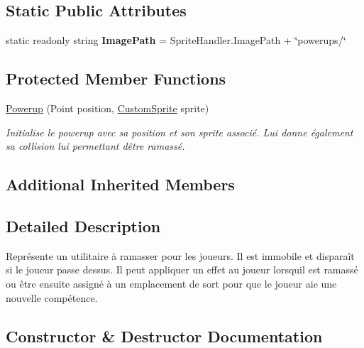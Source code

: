 \subsection*{Static Public Attributes}
\begin{DoxyCompactItemize}
\item 
\mbox{\label{class_tentacle_slicers_1_1powerups_1_1_powerup_acf939e19b2fb3f9ec0a8c47daa795a8c}} 
static readonly string {\bfseries Image\+Path} = Sprite\+Handler.\+Image\+Path + \char`\"{}powerups/\char`\"{}
\end{DoxyCompactItemize}
\subsection*{Protected Member Functions}
\begin{DoxyCompactItemize}
\item 
\hyperlink{class_tentacle_slicers_1_1powerups_1_1_powerup_a4b83aa8ef331b7af95c7a33b8e442f31}{Powerup} (Point position, \hyperlink{class_tentacle_slicers_1_1graphics_1_1_custom_sprite}{Custom\+Sprite} sprite)
\begin{DoxyCompactList}\small\item\em Initialise le powerup avec sa position et son sprite associé. Lui donne également sa collision lui permettant d\textquotesingle{}être ramassé. \end{DoxyCompactList}\end{DoxyCompactItemize}
\subsection*{Additional Inherited Members}


\subsection{Detailed Description}
Représente un utilitaire à ramasser pour les joueurs. Il est immobile et disparaît si le joueur passe dessus. Il peut appliquer un effet au joueur lorsqu\textquotesingle{}il est ramassé ou être ensuite assigné à un emplacement de sort pour que le joueur aie une nouvelle compétence. 



\subsection{Constructor \& Destructor Documentation}
\mbox{\label{class_tentacle_slicers_1_1powerups_1_1_powerup_a4b83aa8ef331b7af95c7a33b8e442f31}} 
